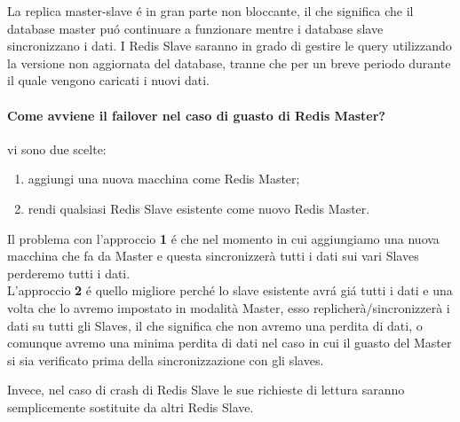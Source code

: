 La replica master-slave é in gran parte non bloccante, il che significa che il database master puó continuare a funzionare
mentre i database slave sincronizzano i dati.
I Redis Slave saranno in grado di gestire le query utilizzando la versione non aggiornata del database, tranne che per un breve
periodo durante il quale vengono caricati i nuovi dati.

\paragraph{Come avviene il failover nel caso di guasto di Redis Master?\\}
vi sono due scelte:
\begin{enumerate}
    \item aggiungi una nuova macchina come Redis Master;
    \item rendi qualsiasi Redis Slave esistente come nuovo Redis Master.
\end{enumerate}
Il problema con l'approccio \textbf{1} é che nel momento in cui aggiungiamo una nuova macchina che fa da Master e questa sincronizzerà
tutti i dati sui vari Slaves perderemo tutti i dati.\\
L'approccio \textbf{2} é quello migliore perché lo slave esistente avrá giá tutti i dati e una volta che lo avremo impostato in modalità
Master, esso replicherà/sincronizzerà i dati su tutti gli Slaves, il che significa che non avremo una perdita di dati, o comunque
avremo una minima perdita di dati nel caso in cui il guasto del Master si sia verificato prima della sincronizzazione con gli slaves.

Invece, nel caso di crash di Redis Slave le sue richieste di lettura saranno semplicemente sostituite da altri Redis Slave.

